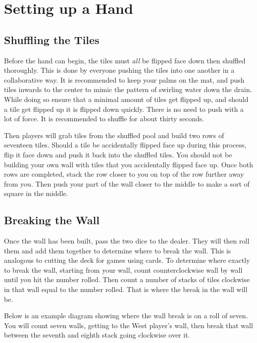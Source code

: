 \section{Setting up a Hand}\label{core:sec:hand}

\subsection{Shuffling the Tiles}\label{core:ssec:shuffling}

Before the hand can begin, the tiles must \emph{all} be flipped face down then shuffled thoroughly. This is done by everyone pushing the tiles into one another in a collaborative way. It is recommended to keep your palms on the mat, and push tiles inwards to the center to mimic the pattern of swirling water down the drain. While doing so ensure that a minimal amount of tiles get flipped up, and should a tile get flipped up it is flipped down quickly. There is no need to push with a lot of force. It is recommended to shuffle for about thirty seconds.

Then players will grab tiles from the shuffled pool and build two rows of seventeen tiles. Should a tile be accidentally flipped face up during this process, flip it face down and push it back into the shuffled tiles. You should not be building your own wall with tiles that you accidentally flipped face up. Once both rows are completed, stack the row closer to you on top of the row further away from you. Then push your part of the wall closer to the middle to make a sort of square in the middle.

\subsection{Breaking the Wall}\label{core:ssec:breaking}

Once the wall has been built, pass the two dice to the dealer. They will then roll them and add them together to determine where to break the wall. This is analogous to cutting the deck for games using cards. To determine where exactly to break the wall, starting from your wall, count counterclockwise wall by wall until you hit the number rolled. Then count a number of stacks of tiles clockwise in that wall equal to the number rolled. That is where the break in the wall will be.

Below is an example diagram showing where the wall break is on a roll of seven. You will count seven walls, getting to the West player's wall, then break that wall between the seventh and eighth stack going clockwise over it.

